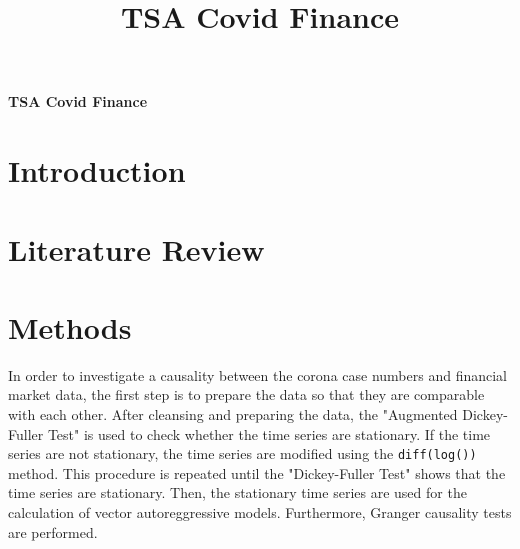 \documentclass[11pt]{article}
\title{TSA Covid Finance}
\begin{document}
\begin{center}
\textbf{\Large TSA Covid Finance}    
\end{center}


\section{Introduction}
\section{Literature Review}
\section{Methods}
In order to investigate a causality between the corona case numbers and financial market data, the first step is to prepare the data so that they are comparable with each other. After cleansing and preparing the data, the "Augmented Dickey-Fuller Test" is used to check whether the time series are stationary. If the time series are not stationary, the time series are modified using the \lstinline{diff(log())} method. This procedure is repeated until the "Dickey-Fuller Test" shows that the time series are stationary. Then, the stationary time series are used for the calculation of vector autoreggressive models. Furthermore, Granger causality tests are performed.
\end{document}
